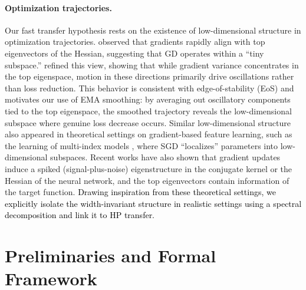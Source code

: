 \documentclass{article} %
\newcommand{\rev}[1]{\textcolor{black}{#1}}
\begin{document}
\paragraph{Optimization trajectories.}
Our fast transfer hypothesis rests on the existence of low-dimensional structure in optimization trajectories. \cite{gur2018gradient} observed that gradients rapidly align with top eigenvectors of the Hessian, suggesting that GD operates within a ``tiny subspace.'' \cite{song2024does} refined this view, showing that while gradient variance concentrates in the top eigenspace, motion in these directions primarily drive oscillations rather than loss reduction. This behavior is consistent with edge-of-stability (EoS) \cite{cohen2021gradient,damian2022self} and motivates our use of EMA smoothing: by averaging out oscillatory components tied to the top eigenspace, the smoothed trajectory reveals the low-dimensional subspace where genuine loss decrease occurs. 
Similar low-dimensional structure also appeared in theoretical settings on gradient-based feature learning, such as the learning of multi-index models \cite{abbe2022merged,damian2022neural,bietti2023learning,mousavi2023neural,glasgow2025mean}, where SGD ``localizes'' parameters into low-dimensional subspaces. 
Recent works have also shown that gradient updates induce a spiked (signal-plus-noise) eigenstructure in the conjugate kernel \cite{ba2022high,moniri2023theory,wang2024nonlinear,dandi2024random} or the Hessian \cite{arous2023high,montanari2025phase} of the neural network, and the top eigenvectors contain information of the target function. \rev{Drawing inspiration from these theoretical settings, we explicitly isolate the width-invariant structure in realistic settings using a spectral decomposition and link it to HP transfer.}

\vspace{-1.mm}
\section{Preliminaries and Formal Framework}\label{sec:framework}
\vspace{-0.5mm}
\end{document}
